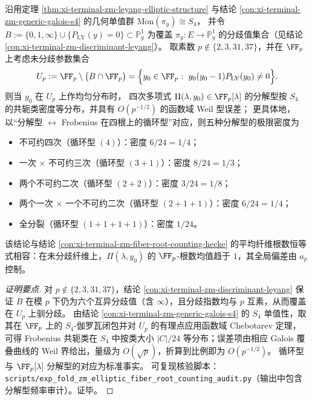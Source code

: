 \begin{conclusion}\label{con:xi-terminal-zm-s4-modp-splitting-density}
沿用定理 \ref{thm:xi-terminal-zm-leyang-elliptic-structure} 与结论 \ref{con:xi-terminal-zm-generic-galois-s4} 的几何单值群 \(\mathrm{Mon}(\pi_y)\cong S_4\)，
并令
\(
B:=\{0,1,\infty\}\cup\{P_{\mathrm{LY}}(y)=0\}\subset \mathbb P^1_y
\)
为覆盖 \(\pi_y:E\to\mathbb P^1_y\) 的分歧值集合（见结论 \ref{con:xi-terminal-zm-discriminant-leyang}）。
取素数 \(p\notin\{2,3,31,37\}\)，并在 \(\FF_p\) 上考虑未分歧参数集合
\[
U_p:=\FF_p\setminus\bigl(B\cap \FF_p\bigr)
=\Bigl\{y_0\in\FF_p:\ y_0(y_0-1)P_{\mathrm{LY}}(y_0)\neq 0\Bigr\}.
\]
则当 \(y_0\) 在 \(U_p\) 上作均匀分布时，
四次多项式 \(\Pi(\lambda,y_0)\in\FF_p[\lambda]\) 的分解型按 \(S_4\) 的共轭类密度等分布，并具有 \(O(p^{-1/2})\) 的函数域 Weil 型误差；
更具体地，以“分解型 \(\leftrightarrow\) Frobenius 在四根上的循环型”对应，则五种分解型的极限密度为
\begin{itemize}
  \item 不可约四次（循环型 \((4)\)）：密度 \(6/24=1/4\)；
  \item 一次 \(\times\) 不可约三次（循环型 \((3+1)\)）：密度 \(8/24=1/3\)；
  \item 两个不可约二次（循环型 \((2+2)\)）：密度 \(3/24=1/8\)；
  \item 两个一次 \(\times\) 一个不可约二次（循环型 \((2+1+1)\)）：密度 \(6/24=1/4\)；
  \item 全分裂（循环型 \((1+1+1+1)\)）：密度 \(1/24\)。
\end{itemize}
该结论与结论 \ref{con:xi-terminal-zm-fiber-root-counting-hecke} 的平均纤维根数恒等式相容：在未分歧纤维上，\(\Pi(\lambda,y_0)\) 的 \(\FF_p\)-根数均值趋于 \(1\)，其全局偏差由 \(a_p\) 控制。
\end{conclusion}
\begin{proof}[证明要点]
对 \(p\notin\{2,3,31,37\}\)，结论 \ref{con:xi-terminal-zm-discriminant-leyang} 保证 \(B\) 在模 \(p\) 下仍为六个互异分歧值（含 \(\infty\)），且分歧指数均与 \(p\) 互素，从而覆盖在 \(U_p\) 上驯分歧。
由结论 \ref{con:xi-terminal-zm-generic-galois-s4} 的 \(S_4\) 单值性，取其在 \(\FF_p\) 上的 \(S_4\)-伽罗瓦闭包并对 \(U_p\) 的有理点应用函数域 Chebotarev 定理，
可得 Frobenius 共轭类在 \(S_4\) 中按类大小 \(|C|/24\) 等分布；误差项由相应 Galois 覆叠曲线的 Weil 界给出，量级为 \(O(\sqrt p)\)，折算到比例即为 \(O(p^{-1/2})\)。
循环型与 \(\FF_p[\lambda]\) 分解型的对应为标准事实。
可复现核验脚本：\texttt{scripts/exp\_fold\_zm\_elliptic\_fiber\_root\_counting\_audit.py}（输出中包含分解型频率审计）。证毕。
\end{proof}

